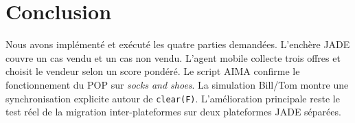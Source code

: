 \documentclass[11pt,a4paper]{report}
\begin{document}
\chapter*{Conclusion}
{}

Nous avons implémenté et exécuté les quatre parties demandées. L'enchère JADE couvre un cas vendu et un cas non vendu. L'agent mobile collecte trois offres et choisit le vendeur selon un score pondéré. Le script AIMA confirme le fonctionnement du POP sur \emph{socks and shoes}. La simulation Bill/Tom montre une synchronisation explicite autour de \texttt{clear(F)}. L'amélioration principale reste le test réel de la migration inter-plateformes sur deux plateformes JADE séparées.
\end{document}

